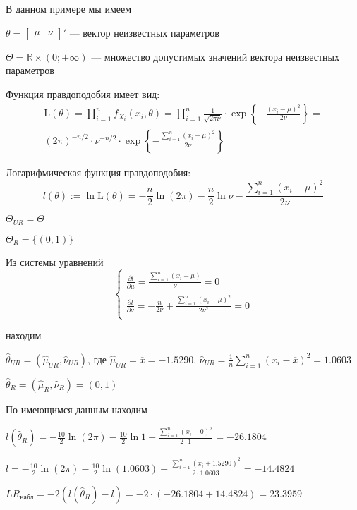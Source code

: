 \documentclass[pdftex,11pt,openany]{book}\usepackage[]{graphicx}\usepackage[]{color}
\begin{document}
\begin{solution}
В данном примере мы имеем

$\theta = \begin{bmatrix}
\mu & \nu
\end{bmatrix}'$ --- вектор неизвестных параметров

$\Theta = \mathbb{R} \times (0; +\infty)$ --- множество допустимых значений вектора неизвестных параметров

Функция правдоподобия имеет вид:
\begin{multline}
\text{L}(\theta) = \prod_{i=1}^n f_{X_i}(x_i, \theta) = \prod_{i=1}^n \frac{1}{\sqrt{2\pi\nu}} \cdot \exp\left\lbrace -\frac{(x_i - \mu)^2}{2\nu} \right\rbrace =\\
 (2\pi)^{-n/2} \cdot \nu^{-n/2} \cdot \exp \left\lbrace -\frac{\sum_{i=1}^n (x_i - \mu)^2}{2\nu} \right\rbrace
\end{multline}

Логарифмическая функция правдоподобия:
$$l(\theta) := \ln \text{L}(\theta) = -\frac{n}{2} \ln(2\pi) - \frac{n}{2} \ln\nu - \frac{\sum_{i=1}^n (x_i - \mu)^2}{2\nu}$$

$\Theta_{UR} = \Theta$

$\Theta_{R} = \{(0,1)\}$

Из системы уравнений
$$\begin{cases}
\frac{\partial l}{\partial \mu} = \frac{\sum_{i=1}^n (x_i - \mu)}{\nu} = 0 \\
\frac{\partial l}{\partial \nu} = -\frac{n}{2\nu} + \frac{\sum_{i=1}^n (x_i - \mu)^2}{2\nu^2} = 0 \\
\end{cases}$$

находим

$\hat{\theta}_{UR} = (\hat{\mu}_{UR}, \hat{\nu}_{UR})$, где $\hat{\mu}_{UR} = \overline{x} = -1.5290$, $\hat{\nu}_{UR} = \frac{1}{n} \sum_{i=1}^n (x_i - \overline{x})^2 = 1.0603$

$\hat{\theta}_{R} = (\hat{\mu}_{R}, \hat{\nu}_{R}) = (0,1)$

По имеющимся данным находим

$l(\hat{\theta}_{R}) = -\frac{10}{2} \ln(2\pi) - \frac{10}{2} \ln 1 - \frac{\sum_{i=1}^n (x_i - 0)^2}{2 \cdot 1} = -26.1804$

$l = -\frac{10}{2} \ln(2\pi) -  \frac{10}{2} \ln (1.0603) - \frac{\sum_{i=1}^n (x_i + 1.5290)^2}{2 \cdot 1.0603} = -14.4824$

$LR_{\text{набл}} = -2(l(\hat{\theta}_{R}) - l) = -2 \cdot (-26.1804 + 14.4824) = 23.3959$


\end{solution}
\end{document}
